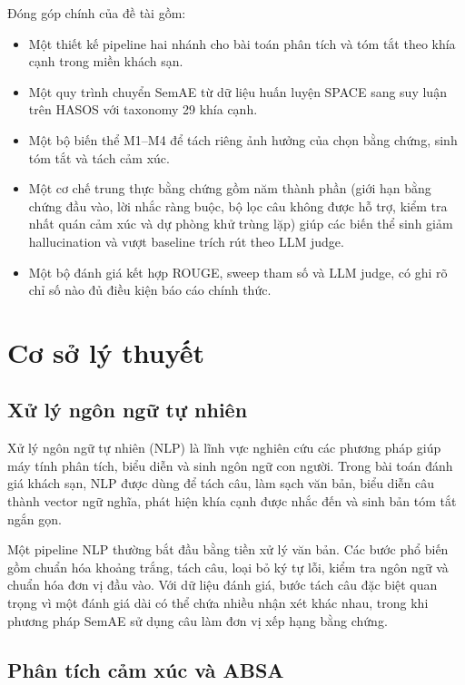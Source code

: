 \documentclass[12pt,a4paper]{report}
\begin{document}
Đóng góp chính của đề tài gồm:

\begin{itemize}[leftmargin=1.2cm]
    \item Một thiết kế pipeline hai nhánh cho bài toán phân tích và tóm tắt theo khía cạnh trong miền khách sạn.
    \item Một quy trình chuyển SemAE từ dữ liệu huấn luyện SPACE sang suy luận trên HASOS với taxonomy 29 khía cạnh.
    \item Một bộ biến thể M1--M4 để tách riêng ảnh hưởng của chọn bằng chứng, sinh tóm tắt và tách cảm xúc.
    \item Một cơ chế trung thực bằng chứng gồm năm thành phần (giới hạn bằng chứng đầu vào, lời nhắc ràng buộc, bộ lọc câu không được hỗ trợ, kiểm tra nhất quán cảm xúc và dự phòng khử trùng lặp) giúp các biến thể sinh giảm hallucination và vượt baseline trích rút theo LLM judge.
    \item Một bộ đánh giá kết hợp ROUGE, sweep tham số và LLM judge, có ghi rõ chỉ số nào đủ điều kiện báo cáo chính thức.
\end{itemize}

\chapter{Cơ sở lý thuyết}

\section{Xử lý ngôn ngữ tự nhiên}

Xử lý ngôn ngữ tự nhiên (NLP) là lĩnh vực nghiên cứu các phương pháp giúp máy tính phân tích, biểu diễn và sinh ngôn ngữ con người. Trong bài toán đánh giá khách sạn, NLP được dùng để tách câu, làm sạch văn bản, biểu diễn câu thành vector ngữ nghĩa, phát hiện khía cạnh được nhắc đến và sinh bản tóm tắt ngắn gọn.

Một pipeline NLP thường bắt đầu bằng tiền xử lý văn bản. Các bước phổ biến gồm chuẩn hóa khoảng trắng, tách câu, loại bỏ ký tự lỗi, kiểm tra ngôn ngữ và chuẩn hóa đơn vị đầu vào. Với dữ liệu đánh giá, bước tách câu đặc biệt quan trọng vì một đánh giá dài có thể chứa nhiều nhận xét khác nhau, trong khi phương pháp SemAE sử dụng câu làm đơn vị xếp hạng bằng chứng.

\section{Phân tích cảm xúc và ABSA}
\end{document}

